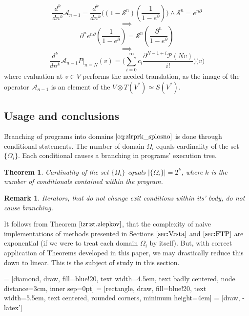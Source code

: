 \documentclass{article}
\newcommand{\Shift}{\mathcal{S}}
\newcommand{\dP}{\mathcal{P}}
\newcommand{\D}{\partial}
\newtheorem{izrek}{Theorem}[section]
\newtheorem{opomba}{Remark}[section]
\begin{document}
    $$\frac{d^k}{dn^k}\mathcal{A}_{n-1}=\frac{d^k}{dn^k}\Big((1-\Shift^n)(\frac{1}{1-e^\D})\Big)\land \Shift^n=e^{n\D}$$
        $$\implies$$
        $$\D^n e^{n\D}(\frac{1}{1-e^\D}) = \Shift^n(\frac{\D^n}{1-e^\D})$$
        $$\implies$$
        \begin{equation}
        \frac{d^k}{dn^k}\mathcal{A}_{n-1}P\vert_{n=N}(v)=\Big(\sum\limits_{i=0}^{\infty}c_i\frac{\D^{N-1+i}\dP(Nv)}{i!}\Big)\Big(v\Big)
        \end{equation}
        where evaluation at $v\in V$ performs the needed translation, as the image of the operator $\mathcal{A}_{n-1}$ is an element of the $V\otimes T(V^*)\simeq S(V^*)$.

\subsection{Usage and conclusions} 

Branching of programs into domains $\eqref{eq:zlrprk_splosno}$ is done through conditional statements. The number of domain $\Omega_i$ equals cardinality of the set $\{\Omega_i\}$. Each conditional causes a branching in programs' execution tree.

\begin{izrek}\label{izr:st.zlepkov}
Cardinality of the set $\{\Omega_i\}$ equals $\lvert\{\Omega_i \}\rvert=2^k$, where $k$ is the number of conditionals contained within the program.
\end{izrek}
\begin{opomba}
Iterators, that do not change exit conditions within its' body, do not cause branching.
\end{opomba}

It follows from Theorem $\ref{izr:st.zlepkov}$, that the complexity of naive implementations of methods presented in Sections $\ref{sec:Vrsta}$ and $\ref{sec:FTP}$ are exponential (if we were to treat each domain $\Omega_i$ by itself). But, with correct application of Theorems developed in this paper, we may drastically reduce this down to linear. This is the subject of study in this section.
\vspace{10px}

 = [diamond, draw, fill=blue!20, 
    text width=4.5em, text badly centered, node distance=3cm, inner sep=0pt]
 = [rectangle, draw, fill=blue!20, 
    text width=5.5em, text centered, rounded corners, minimum height=4em]
 = [draw, -latex']
\end{document}
